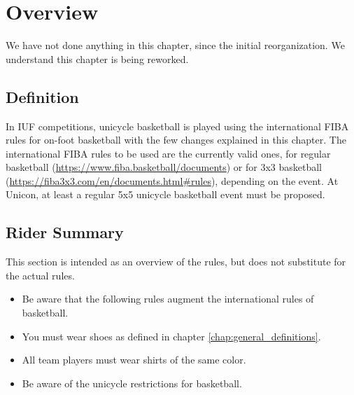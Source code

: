 \chapter{Overview}

\begin{comment2016}
We have not done anything in this chapter, since the initial reorganization.
We understand this chapter is being reworked.
\end{comment2016}

\section{Definition}

In IUF competitions, unicycle basketball is played using the international FIBA rules for on-foot basketball with the few changes explained in this chapter.
The international FIBA rules to be used are the currently valid ones, for regular basketball (\url{https://www.fiba.basketball/documents})
or for 3x3 basketball (\url{https://fiba3x3.com/en/documents.html#rules}), depending on the event.
At Unicon, at least a regular 5x5 unicycle basketball event must be proposed.

\section{Rider Summary}

This section is intended as an overview of the rules, but does not substitute for the actual rules.
\begin{itemize}
\item Be aware that the following rules augment the international rules of basketball.
\item You must wear shoes as defined in chapter \ref{chap:general_definitions}.
\item All team players must wear shirts of the same color.
\item Be aware of the unicycle restrictions for basketball.
\end{itemize}
